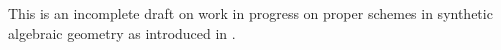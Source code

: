 
This is an incomplete draft on work in progress on proper schemes in synthetic algebraic geometry as introduced in \cite{draft}.